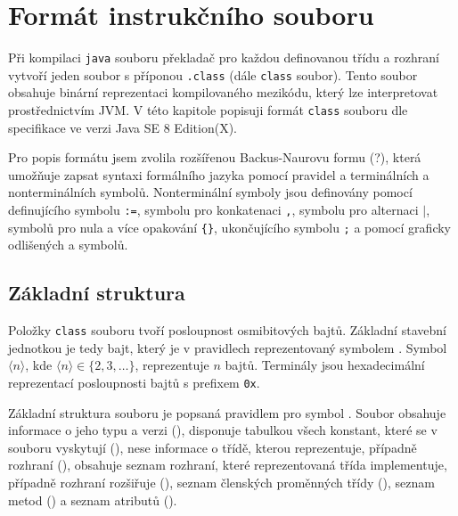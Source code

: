 \chapter{Formát instrukčního souboru}


Při kompilaci \texttt{java} souboru překladač pro každou definovanou třídu a rozhraní vytvoří jeden soubor s příponou \texttt{.class} (dále \texttt{class} soubor). Tento soubor obsahuje binární reprezentaci kompilovaného mezikódu, který lze interpretovat prostřednictvím JVM. V této kapitole popisuji formát \texttt{class} souboru dle specifikace ve verzi Java SE 8 Edition(X).

Pro popis formátu jsem zvolila rozšířenou Backus-Naurovu formu (?), která umožňuje zapsat syntaxi formálního jazyka pomocí pravidel a terminálních a nonterminálních symbolů. Nonterminální symboly jsou definovány pomocí definujícího symbolu \texttt{:=}, symbolu pro konkatenaci \texttt{,}, symbolu pro alternaci \texttt{$\mathtt{|}$}, symbolů pro nula a více opakování \texttt{\{\}}, ukončujícího symbolu \texttt{;} a pomocí graficky odlišených  a  symbolů.

\section{Základní struktura}


Položky \texttt{class} souboru tvoří posloupnost osmibitových bajtů. Základní stavební jednotkou je tedy bajt, který je v pravidlech reprezentovaný symbolem . Symbol $\langle n \rangle$, kde $\langle n \rangle \in \{2,3,\dots\}$, reprezentuje $n$ bajtů. Terminály jsou hexadecimální reprezentací posloupnosti bajtů s prefixem \texttt{0x}. 

Základní struktura souboru je popsaná pravidlem pro symbol . Soubor obsahuje informace o jeho typu a verzi (), disponuje tabulkou všech konstant, které se v souboru vyskytují (), nese informace o třídě, kterou reprezentuje, případně rozhraní (), obsahuje seznam rozhraní, které reprezentovaná třída implementuje, případně rozhraní rozšiřuje  (), seznam členských proměnných třídy (), seznam metod () a seznam atributů (). 

